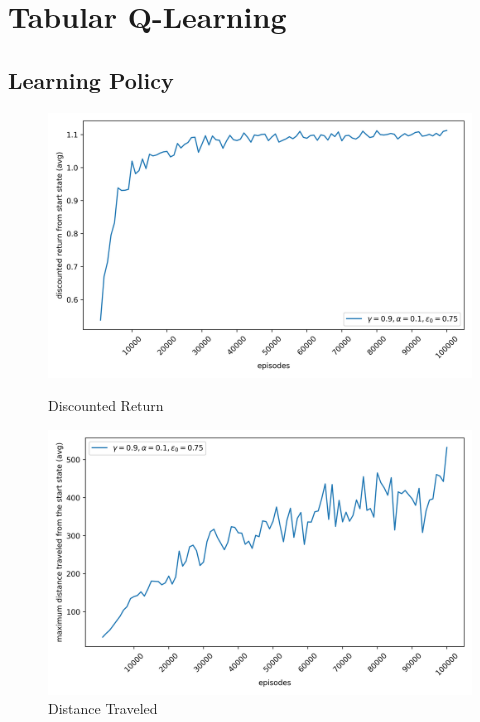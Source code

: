 \section{Tabular Q-Learning}
\subsection{Learning Policy}
\begin{figure}[H]
    \centering
    \begin{minipage}{0.49\linewidth}
        \centering
        \includegraphics[width=\linewidth]{plots/part1-a-rewards.png}
        \caption{Discounted Return}
        
    \end{minipage}
    \hfill
    \begin{minipage}{0.49\linewidth}
        \centering
        \includegraphics[width=\linewidth]{plots/part1-a-distances.png}
        \caption{Distance Traveled}
    \end{minipage}


\end{figure}
